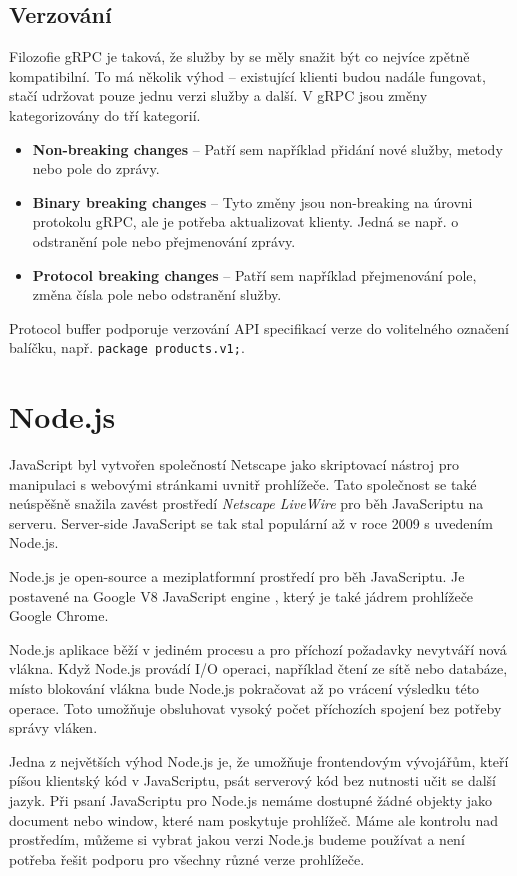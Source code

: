 \documentclass[thesis=M,czech]{FITthesis}[2019/12/23]
\begin{document}
\subsection{Verzování}
Filozofie gRPC je taková, že služby by se měly snažit být co nejvíce zpětně kompatibilní. To má několik výhod -- existující klienti budou nadále fungovat, stačí udržovat pouze jednu verzi služby a další. V gRPC jsou změny kategorizovány do tří kategorií.

\begin{itemize}
    \item \textbf{Non-breaking changes} -- Patří sem například přidání nové služby, metody nebo pole do zprávy.
    \item \textbf{Binary breaking changes} -- Tyto změny jsou non-breaking na úrovni protokolu gRPC, ale je potřeba aktualizovat klienty. Jedná se např. o odstranění pole nebo přejmenování zprávy.
    \item \textbf{Protocol breaking changes} -- Patří sem například přejmenování pole, změna čísla pole nebo odstranění služby.
\end{itemize}

Protocol buffer podporuje verzování API specifikací verze do volitelného označení balíčku, např. \texttt{package products.v1;}. 

\section{Node.js}
JavaScript byl vytvořen společností Netscape jako skriptovací nástroj pro manipulaci s webovými stránkami uvnitř prohlížeče. Tato společnost se také neúspěšně snažila zavést prostředí \textit{Netscape LiveWire} pro běh JavaScriptu na serveru. Server-side JavaScript se tak stal populární až v roce 2009 s uvedením Node.js.

Node.js \cite{node} je open-source a meziplatformní prostředí pro běh JavaScriptu. Je postavené na Google V8 JavaScript engine \cite{v8}, který je také jádrem prohlížeče Google Chrome.

Node.js aplikace běží v jediném procesu a pro příchozí požadavky nevytváří nová vlákna. Když Node.js provádí I/O operaci, například čtení ze sítě nebo databáze, místo blokování vlákna bude Node.js pokračovat až po vrácení výsledku této operace. Toto umožňuje obsluhovat vysoký počet příchozích spojení bez potřeby správy vláken.

Jedna z největších výhod Node.js je, že umožňuje frontendovým vývojářům, kteří píšou klientský kód v JavaScriptu, psát serverový kód bez nutnosti učit se další jazyk. 
Při psaní JavaScriptu pro Node.js nemáme dostupné žádné objekty jako document nebo window, které nam poskytuje prohlížeč. Máme ale kontrolu nad prostředím, můžeme si vybrat jakou verzi Node.js budeme používat a není potřeba řešit podporu pro všechny různé verze prohlížeče.
\end{document}

